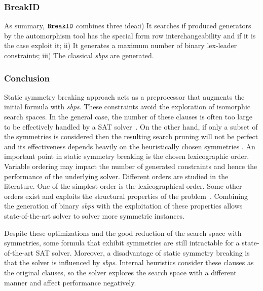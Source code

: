 \subsubsection{BreakID}
As summary, $\texttt{BreakID}$ combines three idea:i) It searches if produced generators by the automorphism tool has the special form row interchangeability and if it is the case exploit it;
ii) It generates a maximum number of binary lex-leader constraints; iii) The classical \textit{sbps} are 
generated.



%


\subsubsection{Conclusion}
Static symmetry breaking approach acts as a preprocessor that augments the initial formula with
\textit{sbps}. These constraints avoid the exploration of isomorphic search spaces.
In the general case, the number of these clauses is often too large to be
effectively handled by a SAT solver~\cite{Luks2004}. 
On the other hand, if only a subset of the symmetries is considered then the resulting search pruning
will not be perfect and its effectiveness depends heavily on the
heuristically chosen symmetries \cite{biere2009handbook}.
An important point in static symmetry breaking is the chosen lexicographic order.
Variable ordering may impact the number of generated constraints and hence the performance of
the underlying solver. Different orders are studied in the literature. 
One of the simplest order is the  lexicographical order.
Some other orders exist and exploits the structural properties of the 
problem~\cite{devriendt2016improved}. Combining the generation of binary \textit{sbps} with the exploitation of
these properties allows state-of-the-art solver to solver more symmetric instances.

Despite these optimizations and the good reduction of the search space with symmetries,
some formula that exhibit symmetries are still intractable for a state-of-the-art SAT solver.
Moreover, a disadvantage of static symmetry breaking is that the solver is influenced by \textit{sbps}.
Internal heuristics consider these clauses as the original clauses, so the solver explores
the search space with a different manner and affect performance negatively.


